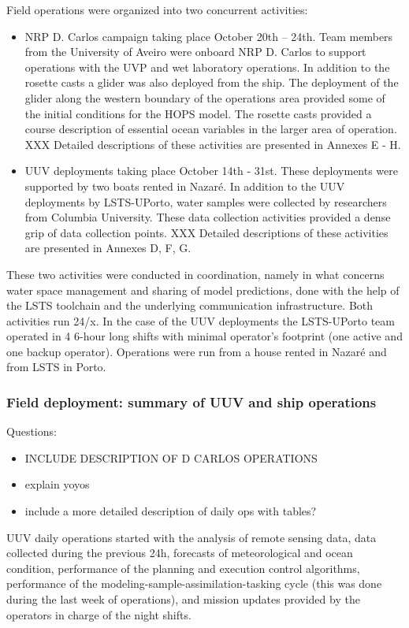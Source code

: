 Field operations were organized into two concurrent activities:

\begin{itemize}
    \item NRP D. Carlos campaign taking place October 20th – 24th. Team members from the University of Aveiro were onboard NRP D. Carlos to support operations with the UVP and wet laboratory operations. In addition to the rosette casts a glider was also deployed from the ship. The deployment of the glider along the western boundary of the operations area provided some of the initial conditions for the HOPS model. The rosette casts provided a course description of essential ocean variables in the larger area of operation. XXX Detailed descriptions of these activities are presented in Annexes E - H.
    \item UUV deployments taking place October 14th - 31st.  These deployments were supported by two boats rented in Nazaré. In addition to the UUV deployments by LSTS-UPorto, water samples were collected by researchers from Columbia University. These data collection activities provided a dense grip of data collection points. XXX Detailed descriptions of these activities are presented in Annexes D, F, G.
\end{itemize}

These two activities were conducted in coordination, namely in what concerns water space management and sharing of model predictions, done with the help of the LSTS toolchain and the underlying communication infrastructure. Both activities run 24/x. In the case of the UUV deployments the LSTS-UPorto team operated in 4 6-hour long shifts with minimal operator’s footprint (one active and one backup operator). Operations were run from a house rented in Nazaré and from LSTS in Porto.


\subsubsection{Field deployment: summary of UUV and ship operations}

Questions:
\begin{itemize}
    \item INCLUDE DESCRIPTION OF D CARLOS OPERATIONS
    \item explain yoyos
    \item include a more detailed description of daily ops with tables?
\end{itemize}


UUV daily operations started with the analysis of remote sensing data, data collected during the previous 24h, forecasts of meteorological and ocean condition, performance of the planning and execution control algorithms, performance of the modeling-sample-assimilation-tasking cycle (this was done during the last week of operations), and mission updates provided by the operators in charge of the night shifts.

